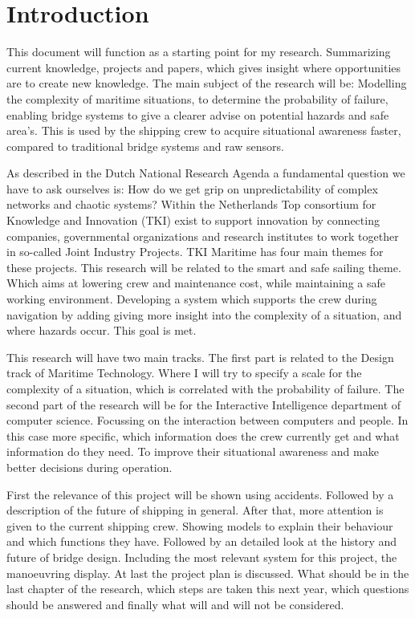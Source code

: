 \chapter*{Introduction}
\label{sec:introduction}
This document will function as a starting point for my research. Summarizing current knowledge, projects and papers, which gives insight where opportunities are to create new knowledge. The main subject of the research will be: Modelling the complexity of maritime situations, to determine the probability of failure, enabling bridge systems to give a clearer advise on potential hazards and safe area's. This is used by the shipping crew to acquire situational awareness faster, compared to traditional bridge systems and raw sensors.

As described in the Dutch National Research Agenda a fundamental question we have to ask ourselves is: How do we get grip on unpredictability of complex networks and chaotic systems? Within the Netherlands Top consortium for Knowledge and Innovation (TKI) exist to support innovation by connecting companies, governmental organizations and research institutes to work together in so-called Joint Industry Projects. TKI Maritime has four main themes for these projects. This research will be related to the smart and safe sailing theme. Which aims at lowering crew and maintenance cost, while maintaining a safe working environment. Developing a system which supports the crew during navigation by adding giving more insight into the complexity of a situation, and where hazards occur. This goal is met.

This research will have two main tracks. The first part is related to the Design track of Maritime Technology. Where I will try to specify a scale for the complexity of a situation, which is correlated with the probability of failure. The second part of the research will be for the Interactive Intelligence department of computer science. Focussing on the interaction between computers and people. In this case more specific, which information does the crew currently get and what information do they need. To improve their situational awareness and make better decisions during operation.

First the relevance of this project will be shown using accidents. Followed by a description of the future of shipping in general.
After that, more attention is given to the current shipping crew. Showing models to explain their behaviour and which functions they have. 
Followed by an detailed look at the history and future of bridge design. Including the most relevant system for this project, the manoeuvring display.
At last the project plan is discussed. What should be in the last chapter of the research, which steps are taken this next year, which questions should be answered and finally what will and will not be considered.